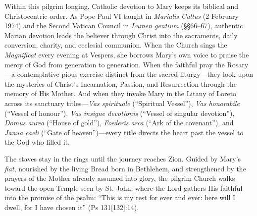 Within this pilgrim longing, Catholic devotion to Mary keeps its biblical and Christocentric order. As Pope Paul VI taught in \textit{Marialis Cultus} (2 February 1974) and the Second Vatican Council in \textit{Lumen gentium} (\S\S 66--67), authentic Marian devotion leads the believer through Christ into the sacraments, daily conversion, charity, and ecclesial communion. When the Church sings the \textit{Magnificat} every evening at Vespers, she borrows Mary's own voice to praise the mercy of God from generation to generation. When the faithful pray the Rosary---a contemplative pious exercise distinct from the sacred liturgy---they look upon the mysteries of Christ's Incarnation, Passion, and Resurrection through the memory of His Mother. And when they invoke Mary in the Litany of Loreto across its sanctuary titles---\textit{Vas spirituale} (``Spiritual Vessel''), \textit{Vas honorabile} (``Vessel of honour''), \textit{Vas insigne devotionis} (``Vessel of singular devotion''), \textit{Domus aurea} (``House of gold''), \textit{Foederis arca} (``Ark of the covenant''), and \textit{Janua caeli} (``Gate of heaven'')---every title directs the heart past the vessel to the God who filled it.

The staves stay in the rings until the journey reaches Zion. Guided by Mary's \textit{fiat}, nourished by the living Bread born in Bethlehem, and strengthened by the prayers of the Mother already assumed into glory, the pilgrim Church walks toward the open Temple seen by St. John, where the Lord gathers His faithful into the promise of the psalm: ``This is my rest for ever and ever: here will I dwell, for I have chosen it'' (Ps 131[132]:14).
